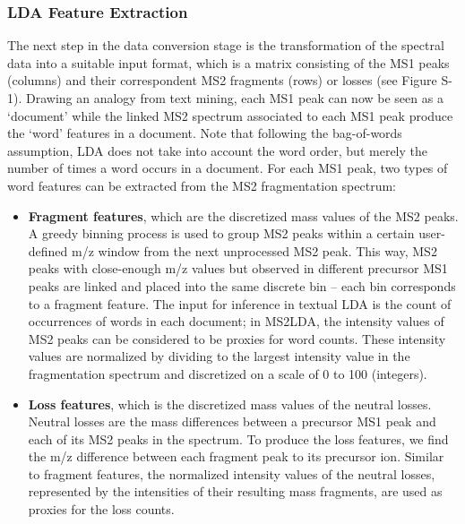 \subsubsection{LDA Feature Extraction}

The next step in the data conversion stage is the transformation of the spectral data into a suitable input format, which is a matrix consisting of the MS1 peaks (columns) and their correspondent MS2 fragments (rows) or losses (see Figure S-1). Drawing an analogy from text mining, each MS1 peak can now be seen as a ‘document’ while the linked MS2 spectrum associated to each MS1 peak produce the ‘word’ features in a document. Note that following the bag-of-words assumption, LDA does not take into account the word order, but merely the number of times a word occurs in a document. For each MS1 peak, two types of word features can be extracted from the MS2 fragmentation spectrum:

\begin{itemize}
\item \textbf{Fragment features}, which are the discretized mass values of the MS2 peaks. A greedy binning process is used to group MS2 peaks within a certain user-defined m/z window from the next unprocessed MS2 peak. This way, MS2 peaks with close-enough m/z values but observed in different precursor MS1 peaks are linked and placed into the same discrete bin – each bin corresponds to a fragment feature. The input for inference in textual LDA is the count of occurrences of words in each document; in MS2LDA, the intensity values of MS2 peaks can be considered to be proxies for word counts. These intensity values are normalized by dividing to the largest intensity value in the fragmentation spectrum and discretized on a scale of 0 to 100 (integers). 
\item \textbf{Loss features}, which is the discretized mass values of the neutral losses. Neutral losses are the mass differences between a precursor MS1 peak and each of its MS2 peaks in the spectrum. To produce the loss features, we find the m/z difference between each fragment peak to its precursor ion. Similar to fragment features, the normalized intensity values of the neutral losses, represented by the intensities of their resulting mass fragments, are used as proxies for the loss counts.
\end{itemize}

